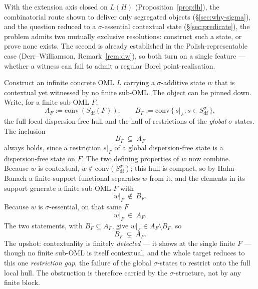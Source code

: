 \documentclass[11pt,reqno]{amsart}
\theoremstyle{plain}
\theoremstyle{definition}
\theoremstyle{remark}
\begin{document}
With the extension axis closed on $L(H)$ (Proposition~\ref{prop:lh}), the
combinatorial route shown to deliver only segregated objects
(\S\ref{sec:why-sigma}), and the question reduced to a $\sigma$-essential contextual
state (\S\ref{sec:predicate}), the problem admits two mutually exclusive resolutions:
construct such a state, or prove none exists. The second is already established in the
Polish-representable case (Derr--Williamson, Remark~\ref{rem:dw}), so both turn on a
single feature --- whether a witness can fail to admit a regular Borel
point-realisation.
\begin{description}[style=nextline, font=\normalfont\bfseries,
    labelwidth=2.6cm, leftmargin=3.0cm]
  \item[Exhibit a $\sigma$-essential witness]
    Construct an infinite concrete OML $L$ carrying a $\sigma$-additive state $w$ that
    is contextual yet witnessed by no finite sub-OML. The object can be pinned down.
    Write, for a finite sub-OML $F$,
    \[
      A_F := \overline{\mathrm{conv}}\,(S_{\mathrm{df}}(F)),
      \qquad
      B_F := \overline{\mathrm{conv}}\,\{\,s|_F : s\in S_{\mathrm{df}}^\sigma\,\},
    \]
    the full local dispersion-free hull and the hull of restrictions of the
    \emph{global} $\sigma$-states. The inclusion
    \[
      B_F\ \subseteq\ A_F
    \]
    always holds, since a restriction $s|_F$ of a global dispersion-free state is a
    dispersion-free state on $F$. The two defining properties of $w$ now combine.
    Because $w$ is contextual, $w\notin\overline{\mathrm{conv}}(S_{\mathrm{df}}^\sigma)$;
    this hull is compact, so by Hahn--Banach a finite-support functional separates $w$
    from it, and the elements in its support generate a finite sub-OML $F$ with
    \[
      w|_F\ \notin\ B_F .
    \]
    Because $w$ is $\sigma$-essential, on that same $F$
    \[
      w|_F\ \in\ A_F .
    \]
    The two statements, with $B_F\subseteq A_F$, give $w|_F\in A_F\setminus B_F$, so
    \[
      B_F\ \subsetneq\ A_F .
    \]
    The upshot: contextuality is finitely \emph{detected} --- it shows at the single
    finite $F$ --- though no finite sub-OML is itself contextual, and the whole target
    reduces to this one \emph{restriction gap}, the failure of the global
    $\sigma$-states to restrict onto the full local hull. The obstruction is therefore
    carried by the $\sigma$-structure, not by any finite block.


\end{description}
\end{document}
